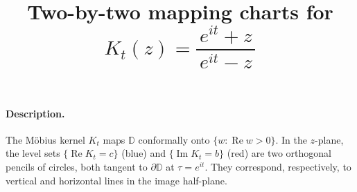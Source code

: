 \documentclass[12pt,a4paper]{article}
\title{Two-by-two mapping charts for $K_t(z)=\dfrac{e^{it}+z}{\,e^{it}-z\,}$}
\author{}
\date{}
\begin{document}
	\maketitle
	

	
	\paragraph{Description.}
	The Möbius kernel $K_t$ maps $\mathbb{D}$ conformally onto $\{w:\operatorname{Re}w>0\}$.
	In the $z$-plane, the level sets $\{\operatorname{Re}K_t=c\}$ (blue) and $\{\operatorname{Im}K_t=b\}$ (red)
	are two orthogonal pencils of circles, both tangent to $\partial\mathbb{D}$ at $\tau=e^{it}$.
	They correspond, respectively, to vertical and horizontal lines in the image half-plane.
	
	\bigskip
	
	\def\tdeg{30}
	
	
	\newcommand{\PanelZRe}{%
		\begin{tikzpicture}[scale=2.25]
			\begin{scope}[rotate=\tdeg]
				\draw[boundary] (0,0) circle (1);
				\draw[axis] (-1.15,0)--(1.2,0);
				\draw[axis] (0,-1.15)--(0,1.2);
				\fill (1,0) circle (0.03);
				\node[below left=2pt] at (1,0) {$\tau=e^{it}$};
				\foreach \c in {0.3,1,3}{
					\pgfmathsetmacro{\xc}{1/(1+\c)}
					\pgfmathsetmacro{\rc}{1/(1+\c)}
					\draw[regrid] (\xc,0) circle (\rc);
				}
			\end{scope}
		\end{tikzpicture}
	}
	
	\newcommand{\PanelWRe}{%
		\begin{tikzpicture}[scale=2.25]
			\draw[axis] (-0.2,0)--(2.2,0) node[right] {$\operatorname{Re}w$};
			\draw[boundary] (0,-1.2)--(0,1.2);
			\node[left] at (0,1.2) {$\operatorname{Re}w=0$};
			\foreach \c in {0.3,1,3}{
				\draw[regrid] (\c,-1.2)--(\c,1.2);
			}
		\end{tikzpicture}
	}
	
	\newcommand{\PanelZIm}{%
		\begin{tikzpicture}[scale=2.25]
			\begin{scope}[rotate=\tdeg]
				\draw[boundary] (0,0) circle (1);
				\draw[axis] (-1.15,0)--(1.2,0);
				\draw[axis] (0,-1.15)--(0,1.2);
				\fill (1,0) circle (0.03);
				\node[below left=2pt] at (1,0) {$\tau=e^{it}$};
				\foreach \b in {-2,-1,1,2}{
					\pgfmathsetmacro{\yc}{1/(\b)}
					\pgfmathsetmacro{\rb}{abs(\yc)}
					\draw[imgrid] (1,\yc) circle (\rb);
				}
			\end{scope}
		\end{tikzpicture}
	}
	
\end{document}
